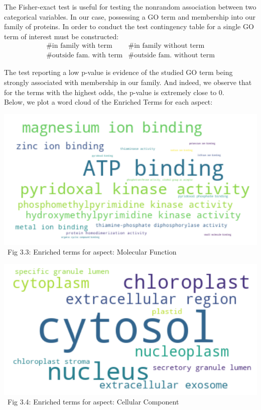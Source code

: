 \documentclass[10pt,twocolumn,letterpaper]{article}
\begin{document}
The Fisher-exact test is useful for testing the nonrandom association between two categorical variables. In our case, possessing a GO term and membership into our family of proteins. In order to conduct the test contingency table for a single GO term of interest must be constructed:
\[
\begin{array}{c|c}
\text{\# in family with term} & \text{\# in family without term} \\ \hline
\text{\# outside fam. with term} & \text{\# outside fam. without term}
\end{array}
\]

The test reporting a low p-value is evidence of the studied GO term being strongly associated with membership in our family. And indeed, we observe that for the terms with the highest odds, the p-value is extremely close to 0. \\


Below, we plot a word cloud of the Enriched Terms for each aspect:

\begin{center}
    \includegraphics[scale=0.30]{report/img/word_cloud_mf.png} \\
    \
    \small{Fig 3.3: Enriched terms for aspect: Molecular Function}
\end{center}

\begin{center}
    \includegraphics[scale=0.30]{report/img/word_cloud_cc.png} \\
    \
    \small{Fig 3.4: Enriched terms for aspect: Cellular Component}
\end{center}
\end{document}
